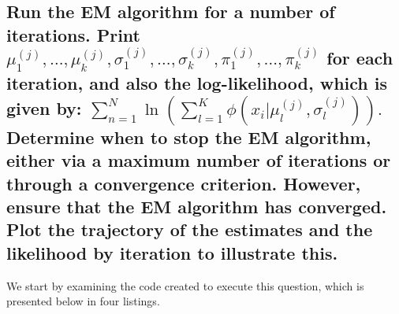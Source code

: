 \documentclass[]{article}
\begin{document}
\subsection{Run the EM algorithm for a number of iterations. Print 
	$\mu_1^{(j)}, \dots, \mu_k^{(j)}, \sigma_1^{(j)}, \dots, \sigma_k^{(j)}, \pi_1^{(j)}, \dots, \pi_k^{(j)}$ 
	for each iteration, and also the log-likelihood, which is given by:
	$
	\sum_{n=1}^{N} \ln \left( \sum_{l=1}^{K} \phi(x_i | \mu_l^{(j)}, \sigma_l^{(j)}) \right).
	$
	Determine when to stop the EM algorithm, either via a maximum number of iterations or through a convergence criterion. However, ensure that the EM algorithm has converged. Plot the trajectory of the estimates and the likelihood by iteration to illustrate this.
}


We start by examining the code created to execute this question, which is presented below in four listings.
\end{document}
